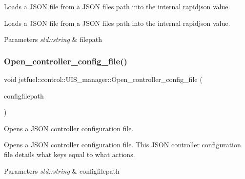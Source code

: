 Loads a J\+S\+ON file from a J\+S\+ON file\textquotesingle{}s path into the internal rapidjson value. 

Loads a J\+S\+ON file from a J\+S\+ON file\textquotesingle{}s path into the internal rapidjson value.


\begin{DoxyParams}{Parameters}
{\em std\+::string} & filepath \\
\hline
\end{DoxyParams}
\mbox{\label{classjetfuel_1_1control_1_1UIS__manager_a8a15d34ba4ae580ef4d39250695a16e3}} 
\subsubsection{\texorpdfstring{Open\+\_\+controller\+\_\+config\+\_\+file()}{Open\_controller\_config\_file()}}
{\footnotesize\ttfamily void jetfuel\+::control\+::\+U\+I\+S\+\_\+manager\+::\+Open\+\_\+controller\+\_\+config\+\_\+file (\begin{DoxyParamCaption}\item[{const std\+::string}]{configfilepath }\end{DoxyParamCaption})}



Opens a J\+S\+ON controller configuration file. 

Opens a J\+S\+ON controller configuration file. This J\+S\+ON controller configuration file details what keys equal to what actions.


\begin{DoxyParams}{Parameters}
{\em std\+::string} & configfilepath \\
\hline
\end{DoxyParams}
\mbox{\label{classjetfuel_1_1control_1_1UIS__manager_a1550f61f5aabf96baa3ea4dc9ccb0988}} 
